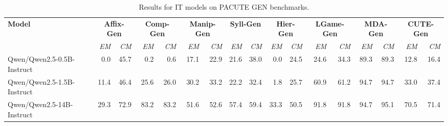 \documentclass{article}
\begin{document}
\begin{table}[htbp]
\centering
\caption{Results for IT models on PACUTE GEN benchmarks.}
\label{tab:results-it:gen}
\begin{threeparttable}
\begin{adjustbox}{max width=\textwidth}
\begin{tabular}{lrrrrrrrrrrrrrrrr}
\toprule
\textbf{Model} & \multicolumn{2}{c}{\textbf{Affix-Gen}} & \multicolumn{2}{c}{\textbf{Comp-Gen}} & \multicolumn{2}{c}{\textbf{Manip-Gen}} & \multicolumn{2}{c}{\textbf{Syll-Gen}} & \multicolumn{2}{c}{\textbf{Hier-Gen}} & \multicolumn{2}{c}{\textbf{LGame-Gen}} & \multicolumn{2}{c}{\textbf{MDA-Gen}} & \multicolumn{2}{c}{\textbf{CUTE-Gen}} \\
\cmidrule(lr){2-3}\cmidrule(lr){4-5}\cmidrule(lr){6-7}\cmidrule(lr){8-9}\cmidrule(lr){10-11}\cmidrule(lr){12-13}\cmidrule(lr){14-15}\cmidrule(lr){16-17}
 & \textit{EM} & \textit{CM} & \textit{EM} & \textit{CM} & \textit{EM} & \textit{CM} & \textit{EM} & \textit{CM} & \textit{EM} & \textit{CM} & \textit{EM} & \textit{CM} & \textit{EM} & \textit{CM} & \textit{EM} & \textit{CM} \\
\midrule
Qwen/Qwen2.5-0.5B-Instruct & \cellcolor[HTML]{F4A582}0.0 & \cellcolor[HTML]{FCFDFE}45.7 & \cellcolor[HTML]{F4A582}0.2 & \cellcolor[HTML]{F4A582}0.6 & \cellcolor[HTML]{F8C7B1}17.1 & \cellcolor[HTML]{F4A582}22.9 & \cellcolor[HTML]{FADBCD}21.6 & \cellcolor[HTML]{FDF6F3}38.0 & \cellcolor[HTML]{F4A582}0.0 & \cellcolor[HTML]{F5B396}24.5 & \cellcolor[HTML]{F9D1BF}24.6 & \cellcolor[HTML]{F4A582}34.3 & \cellcolor[HTML]{A9D1E5}89.3 & \cellcolor[HTML]{DAEBF4}89.3 & \cellcolor[HTML]{F6BDA3}12.8 & \cellcolor[HTML]{F5B193}16.4 \\
Qwen/Qwen2.5-1.5B-Instruct & \cellcolor[HTML]{F9D5C5}11.4 & \cellcolor[HTML]{F9FCFD}46.4 & \cellcolor[HTML]{F9D3C2}25.6 & \cellcolor[HTML]{F9D3C2}26.0 & \cellcolor[HTML]{FBE1D6}30.2 & \cellcolor[HTML]{F7C0A8}33.2 & \cellcolor[HTML]{FADDCF}22.2 & \cellcolor[HTML]{FCE6DC}32.4 & \cellcolor[HTML]{F4AB8A}1.8 & \cellcolor[HTML]{F6B89C}25.7 & \cellcolor[HTML]{E7F2F7}60.9 & \cellcolor[HTML]{FDEEE8}61.2 & \cellcolor[HTML]{9DCBE1}94.7 & \cellcolor[HTML]{B6D8E8}94.7 & \cellcolor[HTML]{FBE4DA}33.0 & \cellcolor[HTML]{FBDFD3}37.4 \\
Qwen/Qwen2.5-14B-Instruct & \cellcolor[HTML]{D4E8F2}29.3 & \cellcolor[HTML]{9CCAE1}72.9 & \cellcolor[HTML]{B5D7E8}83.2 & \cellcolor[HTML]{B5D7E8}83.2 & \cellcolor[HTML]{EEF5F9}51.6 & \cellcolor[HTML]{FDF4F1}52.6 & \cellcolor[HTML]{BCDBEA}57.4 & \cellcolor[HTML]{BFDDEB}59.4 & \cellcolor[HTML]{E1EFF5}33.3 & \cellcolor[HTML]{DDEDF4}50.5 & \cellcolor[HTML]{A3CEE3}91.8 & \cellcolor[HTML]{ADD3E6}91.8 & \cellcolor[HTML]{9DCBE1}94.7 & \cellcolor[HTML]{B3D6E8}95.1 & \cellcolor[HTML]{C6E0ED}70.5 & \cellcolor[HTML]{CBE3EF}71.4 \\

\end{tabular}
\end{adjustbox}
\end{threeparttable}
\end{table}
\end{document}
